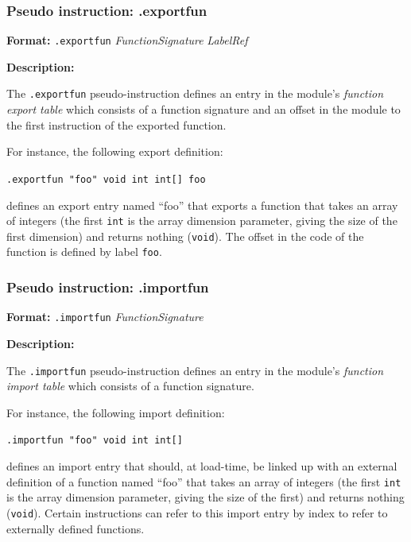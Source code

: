 \newenvironment{pseudo}[2] {
    \subsubsection{Pseudo instruction: #1}
    \textbf{Format:} #2\par
    \textbf{Description:}
}{
}


\begin{pseudo}{.exportfun}{
    \texttt{.exportfun} \emph{FunctionSignature} \emph{LabelRef}
}
The \texttt{.exportfun} pseudo-instruction defines an entry in the module's \emph{function export table} which consists of a function signature and an offset in the module to the first instruction of the exported function.

For instance, the following export definition:

\qquad\texttt{.exportfun "foo" void int int[] foo}

defines an export entry named ``foo'' that exports a function that takes an array of integers (the first \texttt{int} is the array dimension parameter, giving the size of the first dimension) and returns nothing (\texttt{void}). The offset in the code of the function is defined by label \texttt{foo}.
\end{pseudo}


\begin{pseudo}{.importfun}{
    \texttt{.importfun} \emph{FunctionSignature}
}
The \texttt{.importfun} pseudo-instruction defines an entry in the module's \emph{function import table} which consists of a function signature.

For instance, the following import definition:

\qquad\texttt{.importfun "foo" void int int[]}

defines an import entry that should, at load-time, be linked up with an external definition of a function named ``foo'' that takes an array of integers (the first \texttt{int} is the array dimension parameter, giving the size of the first) and returns nothing (\texttt{void}). Certain instructions can refer to this import entry by index to refer to externally defined functions.
\end{pseudo}


